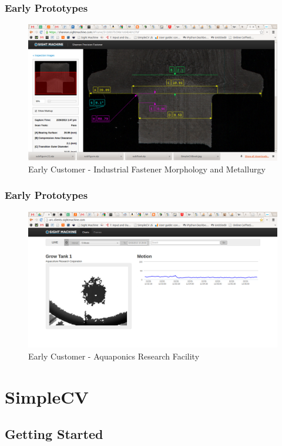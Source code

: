 \documentclass{beamer}
\begin{document}
\begin{frame}
\frametitle{Early Prototypes}

\begin{figure}
  \includegraphics[width=0.8\linewidth]{shannon.png}
  \caption{Early Customer - Industrial Fastener Morphology
      and Metallurgy }
\end{figure}

\end{frame}
\begin{frame}
\frametitle{Early Prototypes}

\begin{figure}
  \includegraphics[width=0.9\linewidth]{arc.png}
  \caption{Early Customer - Aquaponics Research Facility}
\end{figure}

\end{frame}

\section{SimpleCV}
\subsection{Getting Started}
\end{document}
